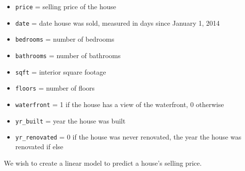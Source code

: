 \documentclass[
]{krantz}
\providecommand{\tightlist}{%
  \setlength{\itemsep}{0pt}\setlength{\parskip}{0pt}}
\begin{document}
\begin{enumerate}
  \begin{itemize}
  \tightlist
  \item
    \texttt{price} = selling price of the house
  \item
    \texttt{date} = date house was sold, measured in days since January 1, 2014
  \item
    \texttt{bedrooms} = number of bedrooms
  \item
    \texttt{bathrooms} = number of bathrooms
  \item
    \texttt{sqft} = interior square footage
  \item
    \texttt{floors} = number of floors
  \item
    \texttt{waterfront} = 1 if the house has a view of the waterfront, 0 otherwise
  \item
    \texttt{yr\_built} = year the house was built
  \item
    \texttt{yr\_renovated} = 0 if the house was never renovated, the year the house was renovated if else
  \end{itemize}

  We wish to create a linear model to predict a house's selling price.


\end{enumerate}
\end{document}

